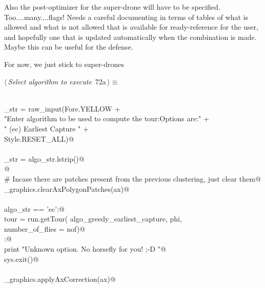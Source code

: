 \documentclass[11.5pt]{report}
\begin{document}
Also the post-optimizer for the super-drone will have to be specified. Too....many....flags! 
Needs a careful documenting in terms of tables of what is allowed and what is not allowed
that is available for ready-reference for the user, and hopefully one that is updated
automatically when the combination is made. Maybe this can be useful for the defense.  

For now, we just stick to super-drones

\begin{flushleft} \small
\begin{minipage}{\linewidth}\label{scrap106}\raggedright\small
{} $\langle\,${\itshape Select algorithm to execute}\nobreak\ {\footnotesize {72a}}$\,\rangle\equiv$
\vspace{-1ex}
\begin{list}{}{} \item
\mbox{}\verb@@\\
\mbox{}\verb@algo_str = raw_input(Fore.YELLOW                                             +\@\\
\mbox{}\verb@        "Enter algorithm to be used to compute the tour:\n Options are:\n"   +\@\\
\mbox{}\verb@        " (ec)   Earliest Capture \n"                                        +\@\\
\mbox{}\verb@        Style.RESET_ALL)@\\
\mbox{}\verb@@\\
\mbox{}\verb@algo_str = algo_str.lstrip()@\\
\mbox{}\verb@ @\\
\mbox{}\verb@# Incase there are patches present from the previous clustering, just clear them@\\
\mbox{}\verb@utils_graphics.clearAxPolygonPatches(ax)@\\
\mbox{}\verb@@\\
\mbox{}\verb@if   algo_str == 'ec':@\\
\mbox{}\verb@      tour = run.getTour( algo_greedy_earliest_capture, phi, \@\\
\mbox{}\verb@                          number_of_flies = nof)@\\
\mbox{}\verb@else:@\\
\mbox{}\verb@      print "Unknown option. No horsefly for you! ;-D "@\\
\mbox{}\verb@      sys.exit()@\\
\mbox{}\verb@@\\
\mbox{}\verb@utils_graphics.applyAxCorrection(ax)@\\

\end{list}
\end{minipage}
\end{flushleft}
\end{document}
